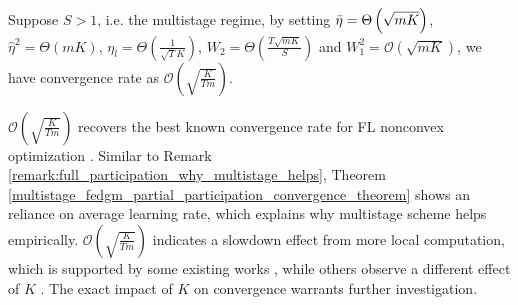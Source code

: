 \begin{corollary}
Suppose $S>1$, i.e. the multistage regime, by setting $\Bar{\eta} = \Theta\left(\sqrt{mK}\right)$, $\hat{\eta}^2 = \Theta\left(mK\right)$, $\eta_l=\Theta\left(\frac{1}{\sqrt{T}K}\right)$, $W_2=\Theta\left(\frac{T\sqrt{mK}}{S}\right)$ and $W_1^2=\mathcal{O}\left(\sqrt{mK}\right)$, we have convergence rate as $\mathcal{O}\left(\sqrt{\frac{K}{Tm}}\right)$.
\label{corollary:fedgm_partial_participation_convergence_rate}
\end{corollary}



\begin{remark}
$\mathcal{O}\left(\sqrt{\frac{K}{Tm}}\right)$ recovers the best known convergence rate for FL nonconvex optimization \citep{yang2021achieving}. Similar to Remark \ref{remark:full_participation_why_multistage_helps}, Theorem \ref{multistage_fedgm_partial_participation_convergence_theorem} shows an reliance on average learning rate, which explains why multistage scheme helps empirically. $\mathcal{O}\left(\sqrt{\frac{K}{Tm}}\right)$ indicates a slowdown effect from more local computation, which is supported by some existing works \citep{Li2020Fed-Non-IID}, while others observe a different effect of $K$ \citep{lin2020dont}. The exact impact of $K$ on convergence warrants further investigation.
\end{remark}


\iffalse

\begin{remark}
$\mathcal{O}\left(\sqrt{\frac{K}{Tn}}\right)$ indicates a slowdown effect from more local computation, which is supported by some existing works \citep{Li2020Fed-Non-IID}, while others observe a different effect of $K$ \citep{stich2018localSGD,lin2020dont}. The exact impact of $K$ on convergence warrants further investigation.
\end{remark}

\fi